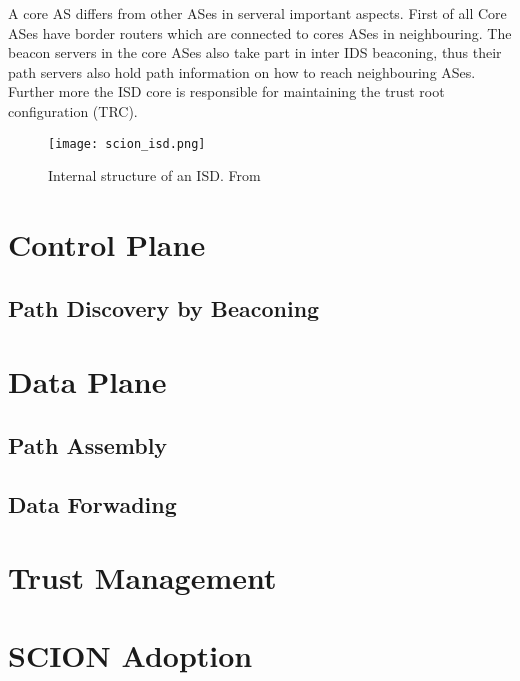 \documentclass[../eva1_scion.tex]{subfiles}
\begin{document}
    A core AS differs from other ASes in serveral important aspects. First of all Core ASes have border routers which are connected to cores ASes in neighbouring. The beacon servers in the core ASes also take part in inter IDS beaconing, thus their path servers also hold path information on how to reach neighbouring ASes. Further more the ISD core is responsible for maintaining the trust root configuration (TRC).
    \begin{figure}[h]
        \centering
        \texttt{[image: scion\_isd.png]}
        \caption{Internal structure of an ISD. From \cite{scion_2017}}%
        \label{fig:isd}
    \end{figure}

    \section{Control Plane}
    \subsection{Path Discovery by Beaconing}\label{ssec:beaconing}
    \section{Data Plane}

    \subsection{Path Assembly} \label{ssec:path_assembly}
    \subsection{Data Forwading}
    
    \section{Trust Management}
    
    \section{SCION Adoption}
\end{document}
